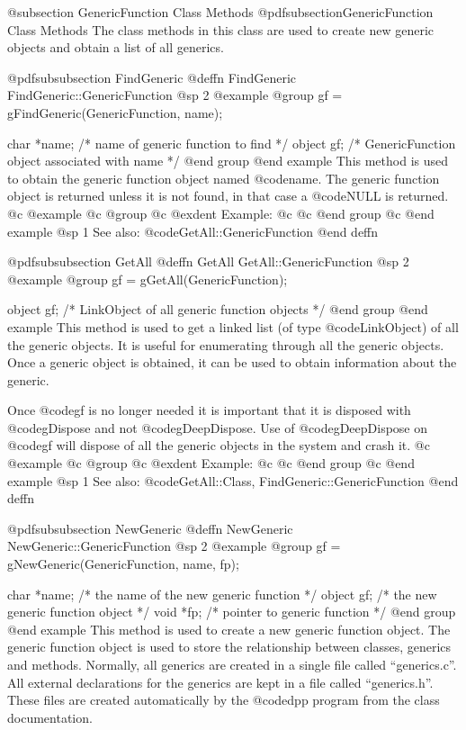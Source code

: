 @subsection GenericFunction Class Methods
@pdfsubsection{GenericFunction Class Methods}
The class methods in this class are used to create new generic objects
and obtain a list of all generics.





@pdfsubsubsection {FindGeneric}
@deffn {FindGeneric} FindGeneric::GenericFunction
@sp 2
@example
@group
gf = gFindGeneric(GenericFunction, name);

char  *name;    /*  name of generic function to find  */
object  gf;     /*  GenericFunction object associated with name  */
@end group
@end example
This method is used to obtain the generic function object named @code{name}.
The generic function object is returned unless it is not found, in that case
a @code{NULL} is returned.
@c @example
@c @group
@c @exdent Example:
@c 
@c @end group
@c @end example
@sp 1
See also:  @code{GetAll::GenericFunction}
@end deffn





@pdfsubsubsection {GetAll}
@deffn {GetAll} GetAll::GenericFunction
@sp 2
@example
@group
gf = gGetAll(GenericFunction);

object  gf;     /*  LinkObject of all generic function objects  */
@end group
@end example
This method is used to get a linked list (of type @code{LinkObject})
of all the generic objects.  It is useful for enumerating through
all the generic objects.  Once a generic object is obtained, it
can be used to obtain information about the generic.

Once @code{gf} is no longer needed it is important that it is
disposed with @code{gDispose} and not @code{gDeepDispose}.  Use
of @code{gDeepDispose} on @code{gf} will dispose of all the generic
objects in the system and crash it.
@c @example
@c @group
@c @exdent Example:
@c 
@c @end group
@c @end example
@sp 1
See also:  @code{GetAll::Class, FindGeneric::GenericFunction}
@end deffn







@pdfsubsubsection {NewGeneric}
@deffn {NewGeneric} NewGeneric::GenericFunction
@sp 2
@example
@group
gf = gNewGeneric(GenericFunction, name, fp);

char    *name;  /*  the name of the new generic function */
object  gf;     /*  the new generic function object  */
void    *fp;    /*  pointer to generic function  */
@end group
@end example
This method is used to create a new generic function object.
The generic function object is used to store the relationship between
classes, generics and methods.  Normally, all generics are created
in a single file called ``generics.c''.  All external declarations for
the generics are kept in a file called ``generics.h''.  These files
are created automatically by the @code{dpp} program from the
class documentation.

